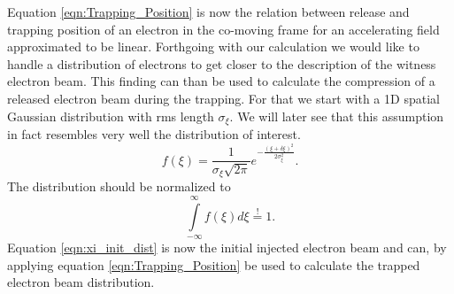 Equation \ref{eqn:Trapping_Position} is now the relation between release and trapping position of an electron in the co-moving frame for an accelerating field approximated to be linear. 
Forthgoing with our calculation we would like to handle a distribution of electrons to get closer to the description of the witness electron beam.
This finding can than be used to calculate the compression of a released electron beam during the trapping.
For that we start with a 1D spatial Gaussian distribution  with rms length $\sigma_\xi$. We will later see that this assumption in fact resembles very well the distribution of interest.
\begin{equation}
\label{eqn:xi_init_dist}
f(\xi)=\frac{1}{\sigma_\xi \sqrt{2\pi}}e^{-\frac{(\xi+\delta \xi)^2}{2\sigma_\xi^2}}.
\end{equation}
The distribution should be normalized to
\begin{equation}
\int \limits_{-\infty}^{\infty} f(\xi)d\xi\stackrel{!}{=}1.
\end{equation}
Equation \ref{eqn:xi_init_dist} is now the initial injected electron beam and can, by applying equation \ref{eqn:Trapping_Position} be used to calculate the trapped electron beam distribution.

